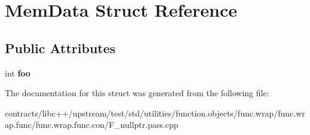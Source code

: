 \hypertarget{struct_mem_data}{}\section{Mem\+Data Struct Reference}
\label{struct_mem_data}
\subsection*{Public Attributes}
\begin{DoxyCompactItemize}
\item 
\mbox{\label{struct_mem_data_ab5ea8ef31f7c5613569b324aacecb442}} 
int {\bfseries foo}
\end{DoxyCompactItemize}


The documentation for this struct was generated from the following file\+:\begin{DoxyCompactItemize}
\item 
contracts/libc++/upstream/test/std/utilities/function.\+objects/func.\+wrap/func.\+wrap.\+func/func.\+wrap.\+func.\+con/F\+\_\+nullptr.\+pass.\+cpp\end{DoxyCompactItemize}
